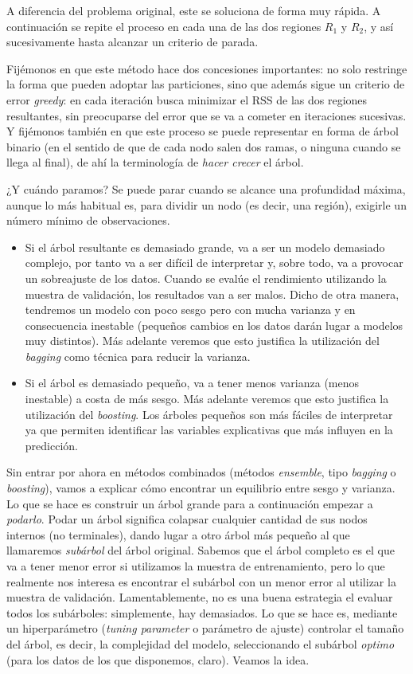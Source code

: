 \documentclass[]{book}
\theoremstyle{break}
\theoremstyle{definition}
\theoremstyle{definition}
\theoremstyle{definition}
\theoremstyle{remark}
\begin{document}
A diferencia del problema original, este se soluciona de forma muy
rápida. A continuación se repite el proceso en cada una de las dos
regiones \(R_1\) y \(R_2\), y así sucesivamente hasta alcanzar un
criterio de parada.

Fijémonos en que este método hace dos concesiones importantes: no solo
restringe la forma que pueden adoptar las particiones, sino que además
sigue un criterio de error \emph{greedy}: en cada iteración busca
minimizar el RSS de las dos regiones resultantes, sin preocuparse del
error que se va a cometer en iteraciones sucesivas. Y fijémonos también
en que este proceso se puede representar en forma de árbol binario (en
el sentido de que de cada nodo salen dos ramas, o ninguna cuando se
llega al final), de ahí la terminología de \emph{hacer crecer} el árbol.

¿Y cuándo paramos? Se puede parar cuando se alcance una profundidad
máxima, aunque lo más habitual es, para dividir un nodo (es decir, una
región), exigirle un número mínimo de observaciones.

\begin{itemize}
\item
  Si el árbol resultante es demasiado grande, va a ser un modelo
  demasiado complejo, por tanto va a ser difícil de interpretar y, sobre
  todo, va a provocar un sobreajuste de los datos. Cuando se evalúe el
  rendimiento utilizando la muestra de validación, los resultados van a
  ser malos. Dicho de otra manera, tendremos un modelo con poco sesgo
  pero con mucha varianza y en consecuencia inestable (pequeños cambios
  en los datos darán lugar a modelos muy distintos). Más adelante
  veremos que esto justifica la utilización del \emph{bagging} como
  técnica para reducir la varianza.
\item
  Si el árbol es demasiado pequeño, va a tener menos varianza (menos
  inestable) a costa de más sesgo. Más adelante veremos que esto
  justifica la utilización del \emph{boosting}. Los árboles pequeños son
  más fáciles de interpretar ya que permiten identificar las variables
  explicativas que más influyen en la predicción.
\end{itemize}

Sin entrar por ahora en métodos combinados (métodos \emph{ensemble},
tipo \emph{bagging} o \emph{boosting}), vamos a explicar cómo encontrar
un equilibrio entre sesgo y varianza. Lo que se hace es construir un
árbol grande para a continuación empezar a \emph{podarlo}. Podar un
árbol significa colapsar cualquier cantidad de sus nodos internos (no
terminales), dando lugar a otro árbol más pequeño al que llamaremos
\emph{subárbol} del árbol original. Sabemos que el árbol completo es el
que va a tener menor error si utilizamos la muestra de entrenamiento,
pero lo que realmente nos interesa es encontrar el subárbol con un menor
error al utilizar la muestra de validación. Lamentablemente, no es una
buena estrategia el evaluar todos los subárboles: simplemente, hay
demasiados. Lo que se hace es, mediante un hiperparámetro (\emph{tuning
parameter} o parámetro de ajuste) controlar el tamaño del árbol, es
decir, la complejidad del modelo, seleccionando el subárbol
\emph{optimo} (para los datos de los que disponemos, claro). Veamos la
idea.
\end{document}
